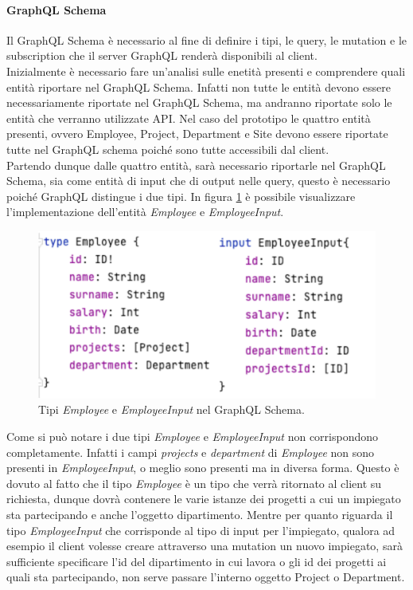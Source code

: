\paragraph{GraphQL Schema}
Il GraphQL Schema è necessario al fine di definire i tipi, le query, le mutation e le subscription che il server GraphQL renderà disponibili al client.\\
Inizialmente è necessario fare un'analisi sulle enetità presenti e comprendere quali entità riportare nel GraphQL Schema. Infatti non tutte le entità devono essere necessariamente riportate nel GraphQL Schema, ma andranno riportate solo le entità che verranno utilizzate API. Nel caso del prototipo le quattro entità presenti, ovvero Employee, Project, Department e Site devono essere riportate tutte nel GraphQL schema poiché sono tutte accessibili dal client.\\
Partendo dunque dalle quattro entità, sarà necessario riportarle nel GraphQL Schema, sia come entità di input che di output nelle query, questo è necessario poiché GraphQL distingue i due tipi. In figura \ref{employee-schema} è possibile visualizzare l'implementazione dell'entità \textit{Employee} e \textit{EmployeeInput}.
\FloatBarrier
\begin{figure}[!ht]
\centering
\includegraphics[width=0.8\linewidth]{immagini/employeeSchema.pdf}
\caption{Tipi \textit{Employee} e \textit{EmployeeInput} nel GraphQL Schema.}
\label{employee-schema}
\end{figure}
\FloatBarrier
Come si può notare i due tipi \textit{Employee} e \textit{EmployeeInput} non corrispondono completamente. Infatti i campi \textit{projects} e \textit{department} di \textit{Employee} non sono presenti in \textit{EmployeeInput}, o  meglio sono presenti ma in diversa forma. Questo è dovuto al fatto che il tipo \textit{Employee} è un tipo che verrà ritornato al client su richiesta, dunque dovrà contenere le varie istanze dei progetti a cui un impiegato sta partecipando e anche l'oggetto dipartimento. Mentre per quanto riguarda il tipo \textit{EmployeeInput} che corrisponde al tipo di input per l'impiegato, qualora ad esempio il client volesse creare attraverso una mutation un nuovo impiegato, sarà sufficiente specificare l'id del dipartimento in cui lavora o gli id dei progetti ai quali sta partecipando, non serve passare l'interno oggetto Project o Department.\\
